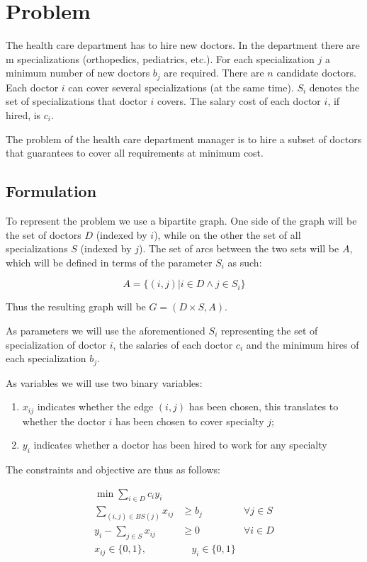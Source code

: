 \documentclass[a4paper,11pt]{article}
\begin{document}
\section{Problem}\label{sec:orig}

The health care department has to hire new doctors. In the department there are
m specializations (orthopedics, pediatrics, etc.). For each specialization $j$ a
minimum number of new doctors $b_j$ are required. There are $n$ candidate
doctors. Each doctor $i$ can cover several specializations (at the same time).
$S_i$ denotes the set of specializations that doctor $i$ covers. The salary cost
of each doctor $i$, if hired, is $c_i$.

The problem of the health care department manager is to hire a subset of doctors
that guarantees to cover all requirements at minimum cost.

\subsection{Formulation}\label{sec:orig-formulation}

To represent the problem we use a bipartite graph. One side of the graph will be
the set of doctors $D$ (indexed by $i$), while on the other the set of all
specializations $S$ (indexed by $j$). The set of arcs between the two sets will
be $A$, which will be defined in terms of the parameter $S_i$ as such:

\[
  A = \{ (i,j) | i\in D \land j\in S_i \}
\]

Thus the resulting graph will be $G = (D\times S, A)$.

As parameters we will use the aforementioned $S_i$ representing the set of
specialization of doctor $i$, the salaries of each doctor $c_i$ and the minimum
hires of each specialization $b_j$.

As variables we will use two binary variables:

\begin{enumerate}
  \item $x_{ij}$ indicates whether the edge $(i,j)$ has been chosen, this
    translates to whether the doctor $i$ has been chosen to cover specialty $j$;
  \item $y_i$ indicates whether a doctor has been hired to work for any
    specialty
\end{enumerate}

The constraints and objective are thus as follows:

\begin{align}
  \min \sum_{i\in D} c_i y_i & \\
  \sum_{(i,j) \in \textit{BS}(j)} x_{ij} & \geq b_j & \forall j \in S \label{eqn:doctor-req} \\
  y_i - \sum_{j\in S} x_{ij} & \geq 0 & \forall i \in D \label{eqn:linking} \\
  x_{ij} \in \{0,1\}, &\quad y_i \in \{0,1\}
\end{align}
\end{document}

